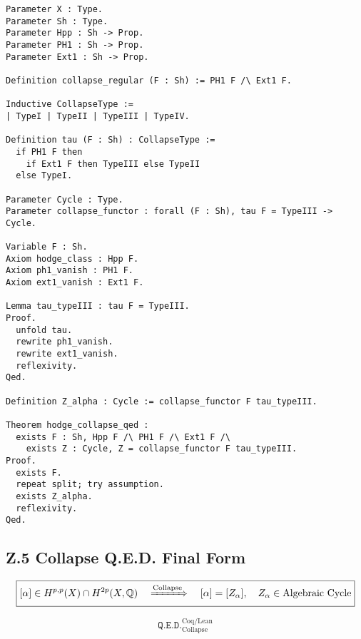 \documentclass[11pt]{article}
\begin{document}
\begin{lstlisting}[language=Coq, caption=Coq Equivalent of Collapse QED]
Parameter X : Type.
Parameter Sh : Type.
Parameter Hpp : Sh -> Prop.
Parameter PH1 : Sh -> Prop.
Parameter Ext1 : Sh -> Prop.

Definition collapse_regular (F : Sh) := PH1 F /\ Ext1 F.

Inductive CollapseType :=
| TypeI | TypeII | TypeIII | TypeIV.

Definition tau (F : Sh) : CollapseType :=
  if PH1 F then
    if Ext1 F then TypeIII else TypeII
  else TypeI.

Parameter Cycle : Type.
Parameter collapse_functor : forall (F : Sh), tau F = TypeIII -> Cycle.

Variable F : Sh.
Axiom hodge_class : Hpp F.
Axiom ph1_vanish : PH1 F.
Axiom ext1_vanish : Ext1 F.

Lemma tau_typeIII : tau F = TypeIII.
Proof.
  unfold tau.
  rewrite ph1_vanish.
  rewrite ext1_vanish.
  reflexivity.
Qed.

Definition Z_alpha : Cycle := collapse_functor F tau_typeIII.

Theorem hodge_collapse_qed :
  exists F : Sh, Hpp F /\ PH1 F /\ Ext1 F /\
    exists Z : Cycle, Z = collapse_functor F tau_typeIII.
Proof.
  exists F.
  repeat split; try assumption.
  exists Z_alpha.
  reflexivity.
Qed.
\end{lstlisting}

\subsection*{Z.5 Collapse Q.E.D. Final Form}

\[
\boxed{
[\alpha] \in H^{p,p}(X) \cap H^{2p}(X, \mathbb{Q}) 
\quad \xRightarrow{\text{Collapse}} \quad 
[\alpha] = [Z_\alpha], \quad Z_\alpha \in \text{Algebraic Cycle}
}
\]

\[
\boxed{
\texttt{Q.E.D.}_{\text{Collapse}}^{\text{Coq/Lean}}
}
\]
\end{document}
